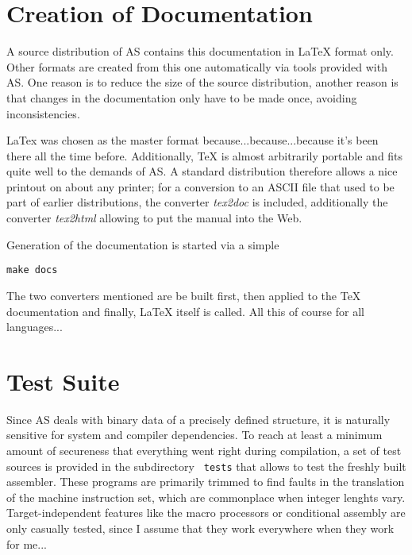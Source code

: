 \documentclass[12pt,twoside]{report}
\begin{document}

\section{Creation of Documentation}

A source distribution of AS contains this documentation in LaTeX format
only.  Other formats are created from this one automatically  via tools
provided with AS.  One reason is to reduce the size of the source
distribution, another reason is that changes in the documentation only
have to be made once, avoiding inconsistencies.

LaTex was chosen as the master format because...because...because it's
been there all the time before.  Additionally, TeX is almost arbitrarily
portable and fits quite well to the demands of AS.  A standard
distribution therefore allows a nice printout on about any printer; for a
conversion to an ASCII file that used to be part of earlier distributions,
the converter {\em tex2doc} is included, additionally the converter {\em
tex2html} allowing to put the manual into the Web.

Generation of the documentation is started via a simple
\begin{verbatim}
make docs
\end{verbatim}
The two converters mentioned are be built first, then applied to the TeX
documentation and finally, LaTeX itself is called.  All this of course for
all languages...


\section{Test Suite}

Since AS deals with binary data of a precisely defined structure, it is
naturally sensitive for system and compiler dependencies.  To reach at
least a minimum amount of secureness that everything went right during
compilation, a set of test sources is provided in the subdirectory {\tt
tests} that allows to test the freshly built assembler.  These programs
are primarily trimmed to find faults in the translation of the machine
instruction set, which are commonplace when integer lenghts vary.
Target-independent features like the macro processors or conditional
assembly are only casually tested, since I assume that they work
everywhere when they work for me...
\end{document}
